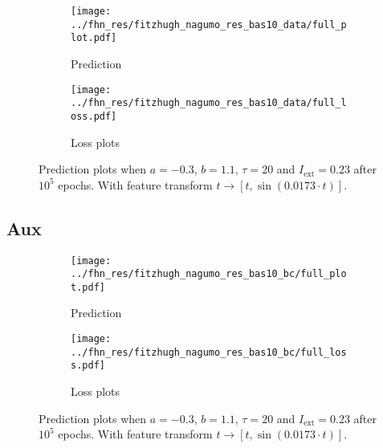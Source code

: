 \documentclass[a4paper]{article}
\begin{document}
\begin{figure}[H]
	\centering 
	\begin{subfigure}[b]{\textwidth}
		\centering
		\texttt{[image: ../fhn\_res/fitzhugh\_nagumo\_res\_bas10\_data/full\_plot.pdf]}
		\caption{Prediction}
		\label{fig:justb03a}
	\end{subfigure}
	\begin{subfigure}[b]{\textwidth}
		\centering
		\texttt{[image: ../fhn\_res/fitzhugh\_nagumo\_res\_bas10\_data/full\_loss.pdf]}
		\caption{Loss plots}
		\label{fig:justb03b}
	\end{subfigure}
	\caption{Prediction plots when $a=-0.3$, $b=1.1$, $\tau=20$ and $ I_{\text{ext}}=0.23$ after $10^5$ epochs. With feature transform $t \rightarrow \left[ t, \sin(0.0173\cdot t) \right] $.}%
\label{plot:justb03}
\end{figure} 	


\subsection{Aux}

\begin{figure}[H]
	\centering 
	\begin{subfigure}[b]{\textwidth}
		\centering
		\texttt{[image: ../fhn\_res/fitzhugh\_nagumo\_res\_bas10\_bc/full\_plot.pdf]}
		\caption{Prediction}
		\label{fig:justb04a}
	\end{subfigure}
	\begin{subfigure}[b]{\textwidth}
		\centering
		\texttt{[image: ../fhn\_res/fitzhugh\_nagumo\_res\_bas10\_bc/full\_loss.pdf]}
		\caption{Loss plots}
		\label{fig:justb04b}
	\end{subfigure}
	\caption{Prediction plots when $a=-0.3$, $b=1.1$, $\tau=20$ and $ I_{\text{ext}}=0.23$ after $10^5$ epochs. With feature transform $t \rightarrow \left[ t, \sin(0.0173\cdot t) \right] $.}%
\label{plot:justb04}
\end{figure} 	
\end{document}
